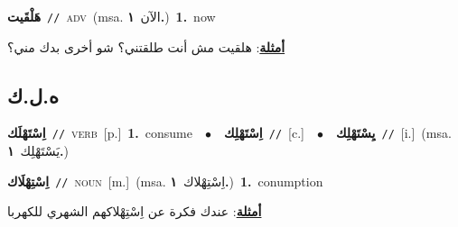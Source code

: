 \documentclass[10pt,a4paper,twoside]{article} %
\begin{document}
\begin{multicols}{2}
{\setlength\topsep{0pt}\textbf{\foreignlanguage{arabic}{هَلْقَيت}}\ {\color{gray}\texttt{//}\color{black}}\ \textsc{adv}\ \color{gray}(msa. \foreignlanguage{arabic}{الآن}~\foreignlanguage{arabic}{\textbf{١.}})\color{black}\ \textbf{1.}~now\  \begin{flushright}\color{gray}\foreignlanguage{arabic}{\textbf{\underline{\foreignlanguage{arabic}{أمثلة}}}: هلقيت مش أنت طلقتني؟ شو أخرى بدك مني؟}\end{flushright}\color{black}} \vspace{2mm}

\vspace{-3mm}
\subsection*{\color{blue}\foreignlanguage{arabic}{ه.ل.ك}\color{blue}{}} 

{\setlength\topsep{0pt}\textbf{\foreignlanguage{arabic}{اِسْتَهْلَك}}\ {\color{gray}\texttt{//}\color{black}}\ \textsc{verb}\ [p.]\ \textbf{1.}~consume\ \ $\bullet$\ \ \setlength\topsep{0pt}\textbf{\foreignlanguage{arabic}{اِسْتَهْلِك}}\ {\color{gray}\texttt{//}\color{black}}\ [c.]\ \ $\bullet$\ \ \setlength\topsep{0pt}\textbf{\foreignlanguage{arabic}{يِسْتَهْلِك}}\ {\color{gray}\texttt{//}\color{black}}\ [i.]\ \color{gray}(msa. \foreignlanguage{arabic}{يَسْتَهْلِك}~\foreignlanguage{arabic}{\textbf{١.}})\color{black}\ } \vspace{2mm}

{\setlength\topsep{0pt}\textbf{\foreignlanguage{arabic}{اِسْتِهْلَاك}}\ {\color{gray}\texttt{//}\color{black}}\ \textsc{noun}\ [m.]\ \color{gray}(msa. \foreignlanguage{arabic}{اِسْتِهْلاك}~\foreignlanguage{arabic}{\textbf{١.}})\color{black}\ \textbf{1.}~conumption\  \begin{flushright}\color{gray}\foreignlanguage{arabic}{\textbf{\underline{\foreignlanguage{arabic}{أمثلة}}}: عندك فكرة عن اِسْتِهْلاكهم الشهري للكهربا}\end{flushright}\color{black}} \vspace{2mm}


\end{multicols}
\end{document}
